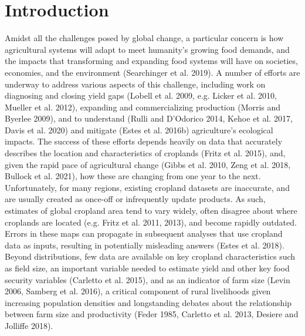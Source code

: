 \documentclass[11pt,a4paper]{article}
\begin{document}
\hypertarget{introduction}{%
\section{Introduction}\label{introduction}}

Amidst all the challenges posed by global change, a particular concern
is how agricultural systems will adapt to meet humanity's growing food
demands, and the impacts that transforming and expanding food systems
will have on societies, economies, and the environment (Searchinger et
al. 2019). A number of efforts are underway to address various aspects
of this challenge, including work on diagnosing and closing yield gaps
(Lobell et al. 2009, e.g. Licker et al. 2010, Mueller et al. 2012),
expanding and commercializing production (Morris and Byerlee 2009), and
to understand (Rulli and D'Odorico 2014, Kehoe et al. 2017, Davis et al.
2020) and mitigate (Estes et al. 2016b) agriculture's ecological
impacts. The success of these efforts depends heavily on data that
accurately describes the location and characteristics of croplands
(Fritz et al. 2015), and, given the rapid pace of agricultural change
(Gibbs et al. 2010, Zeng et al. 2018, Bullock et al. 2021), how these
are changing from one year to the next. Unfortunately, for many regions,
existing cropland datasets are inaccurate, and are usually created as
once-off or infrequently update products. As such, estimates of global
cropland area tend to vary widely, often disagree about where croplands
are located (e.g. Fritz et al. 2011, 2013), and become rapidly outdated.
Errors in these maps can propagate in subsequent analyses that use
cropland data as inputs, resulting in potentially misleading answers
(Estes et al. 2018). Beyond distributions, few data are available on key
cropland characteristics such as field size, an important variable
needed to estimate yield and other key food security variables (Carletto
et al. 2015), and as an indicator of farm size (Levin 2006, Samberg et
al. 2016), a critical component of rural livelihoods given increasing
population densities and longstanding debates about the relationship
between farm size and productivity (Feder 1985, Carletto et al. 2013,
Desiere and Jolliffe 2018).
\end{document}
